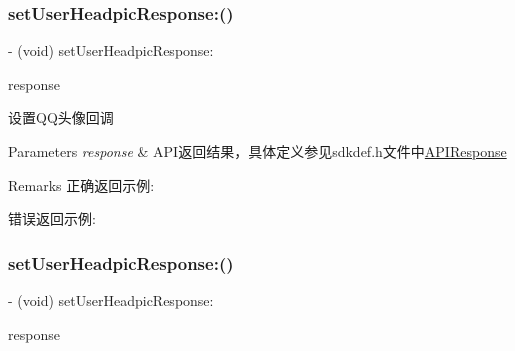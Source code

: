 \subsubsection{\texorpdfstring{set\+User\+Headpic\+Response\+:()}{setUserHeadpicResponse:()}\hspace{0.1cm}{\footnotesize\ttfamily [1/2]}}
{\footnotesize\ttfamily -\/ (void) set\+User\+Headpic\+Response\+: \begin{DoxyParamCaption}\item[{(\mbox{\hyperlink{interface_a_p_i_response}{A\+P\+I\+Response}} $\ast$)}]{response }\end{DoxyParamCaption}\hspace{0.3cm}{\ttfamily [optional]}}

设置\+Q\+Q头像回调 
\begin{DoxyParams}{Parameters}
{\em response} & A\+P\+I返回结果，具体定义参见sdkdef.\+h文件中\mbox{\hyperlink{interface_a_p_i_response}{A\+P\+I\+Response}} \\
\hline
\end{DoxyParams}
\begin{DoxyRemark}{Remarks}
正确返回示例\+: 
\begin{DoxyCodeInclude}
\end{DoxyCodeInclude}
 错误返回示例\+: 
\begin{DoxyCodeInclude}
\end{DoxyCodeInclude}

\end{DoxyRemark}
\mbox{\label{protocol_tencent_session_delegate-p_ae487da5d4b7d86179c8f98cbceac848d}} 
\subsubsection{\texorpdfstring{set\+User\+Headpic\+Response\+:()}{setUserHeadpicResponse:()}\hspace{0.1cm}{\footnotesize\ttfamily [2/2]}}
{\footnotesize\ttfamily -\/ (void) set\+User\+Headpic\+Response\+: \begin{DoxyParamCaption}\item[{(\mbox{\hyperlink{interface_a_p_i_response}{A\+P\+I\+Response}} $\ast$)}]{response }\end{DoxyParamCaption}\hspace{0.3cm}{\ttfamily [optional]}}


